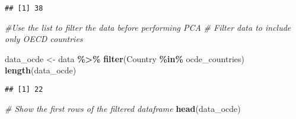 \documentclass[
]{article}
\newenvironment{Shaded}{\begin{snugshade}}{\end{snugshade}}
\newcommand{\CommentTok}[1]{\textcolor[rgb]{0.56,0.35,0.01}{\textit{#1}}}
\newcommand{\FunctionTok}[1]{\textcolor[rgb]{0.13,0.29,0.53}{\textbf{#1}}}
\newcommand{\NormalTok}[1]{#1}
\newcommand{\OtherTok}[1]{\textcolor[rgb]{0.56,0.35,0.01}{#1}}
\newcommand{\SpecialCharTok}[1]{\textcolor[rgb]{0.81,0.36,0.00}{\textbf{#1}}}
\begin{document}
\begin{verbatim}
## [1] 38
\end{verbatim}

\begin{Shaded}
\begin{Highlighting}[]
\CommentTok{\#Use the list to filter the data before performing PCA}
\CommentTok{\# Filter data to include only OECD countries}

\NormalTok{data\_ocde }\OtherTok{\textless{}{-}}\NormalTok{ data }\SpecialCharTok{\%\textgreater{}\%} \FunctionTok{filter}\NormalTok{(Country }\SpecialCharTok{\%in\%}\NormalTok{ ocde\_countries)}
\FunctionTok{length}\NormalTok{(data\_ocde)}
\end{Highlighting}
\end{Shaded}

\begin{verbatim}
## [1] 22
\end{verbatim}

\begin{Shaded}
\begin{Highlighting}[]
\CommentTok{\# Show the first rows of the filtered dataframe}
\FunctionTok{head}\NormalTok{(data\_ocde)}
\end{Highlighting}
\end{Shaded}
\end{document}
